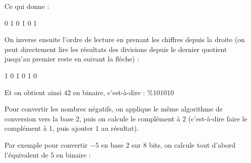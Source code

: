 \documentclass[11pt,a4paper]{article}
\begin{document}
\begin{center}
\begin{minipage}{6cm}

\end{minipage}
\end{center}


Ce qui donne :

\smallskip

{ 0 \hspace*{0.2cm} 1 \hspace*{0.2cm} 0 \hspace*{0.2cm} 1 \hspace*{0.2cm} 0 \hspace*{0.2cm} 1 }

\smallskip

On inverse ensuite l'ordre de lecture en prenant les chiffres depuis la droite (on peut directement lire les résultats des divisions depuis le dernier quotient jusqu'au premier reste en suivant la flèche) :

\smallskip

{ 1 \hspace*{0.2cm} 0 \hspace*{0.2cm} 1 \hspace*{0.2cm} 0 \hspace*{0.2cm} 1 \hspace*{0.2cm} 0 }

\smallskip

Et on obtient ainsi $ 42 $ en binaire, c'est-à-dire : $ \% 101010 $


\bigskip


Pour convertir les nombres négatifs, on applique le même algorithme de conversion vers la base 2, puis on calcule le complément à 2 (c'est-à-dire faire le complément à 1, puis ajouter $ 1 $ au résultat).

\bigskip

Par exemple pour convertir $ -5 $ en base 2 sur 8 bits, on calcule tout d'abord l'équivalent de $ 5 $ en binaire :
\end{document}
